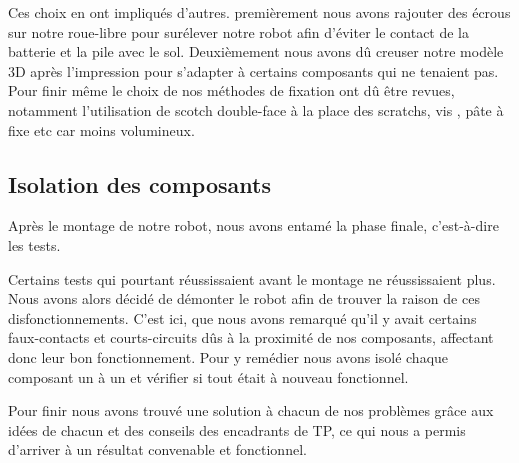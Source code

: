  Ces choix en ont impliqués d'autres. premièrement nous avons rajouter des écrous sur notre roue-libre pour surélever notre robot afin d'éviter le contact de la batterie et la pile avec le sol. Deuxièmement nous avons dû creuser notre modèle 3D après l'impression pour s'adapter à certains composants qui ne tenaient pas. Pour finir même le choix de nos méthodes de fixation ont dû être revues, notamment l'utilisation de scotch double-face à la place des scratchs, vis , pâte à fixe etc car moins volumineux.

\subsection{Isolation des composants}
Après le montage de notre robot, nous avons entamé la phase finale, c'est-à-dire les tests.

Certains tests qui pourtant réussissaient avant le montage ne réussissaient plus. Nous avons alors décidé de démonter le robot afin de trouver la raison de ces disfonctionnements. C'est ici, que nous avons remarqué qu'il y avait certains faux-contacts et courts-circuits dûs à la proximité de nos composants, affectant donc leur bon fonctionnement. Pour y remédier nous avons isolé chaque composant un à un et vérifier si tout était à nouveau fonctionnel.

\bigbreak
Pour finir nous avons trouvé une solution à chacun de nos problèmes grâce aux idées de chacun et des conseils des encadrants de TP, ce qui nous a permis d'arriver à un résultat convenable et fonctionnel.



\newpage
